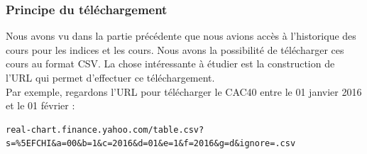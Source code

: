\subsubsection{Principe du téléchargement}

Nous avons vu dans la partie précédente que nous avions accès à l'historique des cours pour les indices et les cours. Nous avons la possibilité de télécharger ces cours au format CSV. La chose intéressante à étudier est la construction de l'URL qui permet d'effectuer ce téléchargement. \\ 

Par exemple, regardons l'URL pour télécharger le CAC40 entre le 01 janvier 2016 et le 01 février : 
\begin{lstlisting}
real-chart.finance.yahoo.com/table.csv?s=%5EFCHI&a=00&b=1&c=2016&d=01&e=1&f=2016&g=d&ignore=.csv
\end{lstlisting}